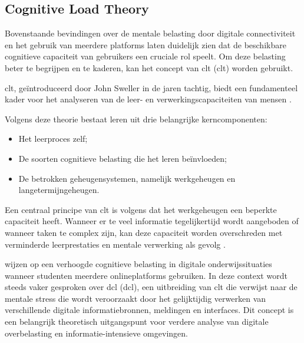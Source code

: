 \vspace{1em}

\subsection{Cognitive Load Theory}
\label{subsec:clt}

\vspace{1em}

Bovenstaande bevindingen over de mentale belasting door digitale connectiviteit en het gebruik van meerdere platforms laten duidelijk zien dat de beschikbare cognitieve capaciteit van gebruikers een cruciale rol speelt. Om deze belasting beter te begrijpen en te kaderen, kan het concept van \acrlong{clt} (\acrshort{clt}) worden gebruikt.

\vspace{1em}

\acrshort{clt}, geïntroduceerd door John Sweller in de jaren tachtig, biedt een fundamenteel kader voor het analyseren van de leer- en verwerkingscapaciteiten van mensen \autocite{Ibrahim2025}. 

\newpage

Volgens deze theorie bestaat leren uit drie belangrijke kerncomponenten: 

\begin{itemize}
    \item Het leerproces zelf;
    \item De soorten cognitieve belasting die het leren beïnvloeden;
    \item De betrokken geheugensystemen, namelijk werkgeheugen en langetermijngeheugen.
\end{itemize}

Een centraal principe van \acrshort{clt} is volgens \textcite{Ibrahim2025} dat het werkgeheugen een beperkte capaciteit heeft. Wanneer er te veel informatie tegelijkertijd wordt aangeboden of wanneer taken te complex zijn, kan deze capaciteit worden overschreden met verminderde leerprestaties en mentale verwerking als gevolg \autocite{Ibrahim2025}. 

\vspace{1em}

\textcite{Ibrahim2025} wijzen op een verhoogde cognitieve belasting in digitale onderwijssituaties wanneer studenten meerdere onlineplatforms gebruiken. In deze context wordt steeds vaker gesproken over \acrlong{dcl} (\acrshort{dcl}), een uitbreiding van \acrshort{clt} die verwijst naar de mentale stress die wordt veroorzaakt door het gelijktijdig verwerken van verschillende digitale informatiebronnen, meldingen en interfaces. Dit concept is een belangrijk theoretisch uitgangspunt voor verdere analyse van digitale overbelasting en informatie-intensieve omgevingen.

